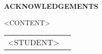 \thispagestyle{empty}
\begin{center}
\textup{\large{\textbf{ACKNOWLEDGEMENTS}}} \\[0.1in]
\end{center}

\justify
\indent
<CONTENT>
\vfill

\justify
\begin{tabularx}{\linewidth}{X X}
<STUDENT>
\end{tabularx}


\pagebreak